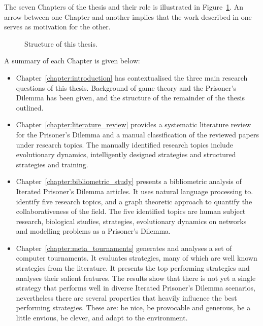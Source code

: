 The seven Chapters of the thesis and their role is illustrated in
Figure~\ref{fig:structure_of_thesis}. An arrow between one Chapter and another
implies that the work described in one serves as motivation for the other.

\begin{figure}[!hbtp]
    \centering
    
    \caption{Structure of this thesis.}\label{fig:structure_of_thesis}
\end{figure}

A summary of each Chapter is given below:

\begin{itemize}
    \item Chapter~\ref{chapter:introduction} has contextualised the three main
    research questions of this thesis. Background of game theory and the
    Prisoner's Dilemma has been given, and the structure
    of the remainder of the thesis outlined.
    \item Chapter~\ref{chapter:literature_review} provides a systematic
    literature review for the Prisoner's Dilemma and a manual classification of
    the reviewed papers under research topics. The manually identified research
    topics include evolutionary dynamics, intelligently designed strategies
    and structured strategies and training.
    \item Chapter~\ref{chapter:bibliometric_study} presents a bibliometric
    analysis of \totalarticles Iterated Prisoner's Dilemma articles. It uses natural language processing to.
    identify five research topics, and a graph theoretic approach to quantify the
    collaborativeness of the field. The five identified topics are human subject
    research, biological studies, strategies, evolutionary dynamics on networks
    and modelling problems as a Prisoner's Dilemma.
    \item Chapter~\ref{chapter:meta_tournaments} generates and analyses a set of
    \numberofalltournaments computer tournaments. It evaluates
    \numberofstrategies strategies, many of which are well known strategies from
    the literature. It presents the top performing strategies and analyses their
    salient features. The results show that there is not yet a single strategy
    that performs well in diverse Iterated Prisoner's Dilemma scenarios,
    nevertheless there are several properties that heavily influence the best
    performing strategies. These are: be nice, be provocable and generous, be a
    little envious, be clever, and adapt to the environment.

\end{itemize}
